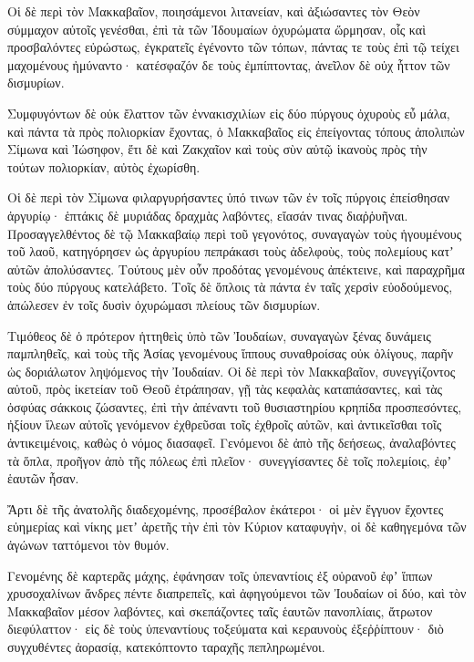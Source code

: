 {\par }{\PP {}Οἱ δὲ περὶ τὸν Μακκαβαῖον, ποιησάμενοι λιτανείαν, καὶ ἀξιώσαντες τὸν Θεὸν σύμμαχον αὐτοῖς γενέσθαι, ἐπὶ τὰ τῶν Ἰδουμαίων ὀχυρώματα ὥρμησαν,
οἷς καὶ προσβαλόντες εὐρώστως, ἐγκρατεῖς ἐγένοντο τῶν τόπων, πάντας τε τοὺς ἐπὶ τῷ τείχει μαχομένους ἠμύναντο· κατέσφαζόν δε τοὺς ἐμπίπτοντας, ἀνεῖλον δὲ οὐχ ἧττον τῶν δισμυρίων.
\par }{\PP {}Συμφυγόντων δὲ οὐκ ἔλαττον τῶν ἐννακισχιλίων εἰς δύο πύργους ὀχυροὺς εὖ μάλα, καὶ πάντα τὰ πρὸς πολιορκίαν ἔχοντας,
ὁ Μακκαβαῖος εἰς ἐπείγοντας τόπους ἀπολιπὼν Σίμωνα καὶ Ἰώσηφον, ἔτι δὲ καὶ Ζακχαῖον καὶ τοὺς σὺν αὐτῷ ἱκανοὺς πρὸς τὴν τούτων πολιορκίαν, αὐτὸς ἐχωρίσθη.
\par }{\PP {}Οἱ δὲ περὶ τὸν Σίμωνα φιλαργυρήσαντες ὑπό τινων τῶν ἐν τοῖς πύργοις ἐπείσθησαν ἀργυρίῳ· ἑπτάκις δὲ μυριάδας δραχμὰς λαβόντες, εἴασάν τινας διαῤῥυῆναι.
Προσαγγελθέντος δὲ τῷ Μακκαβαίῳ περὶ τοῦ γεγονότος, συναγαγὼν τοὺς ἡγουμένους τοῦ λαοῦ, κατηγόρησεν ὡς ἀργυρίου πεπράκασι τοὺς ἀδελφοὺς, τοὺς πολεμίους κατʼ αὐτῶν ἀπολύσαντες.
Τούτους μὲν οὖν προδότας γενομένους ἀπέκτεινε, καὶ παραχρῆμα τοὺς δύο πύργους κατελάβετο.
Τοῖς δὲ ὅπλοις τὰ πάντα ἐν ταῖς χερσὶν εὐοδούμενος, ἀπώλεσεν ἐν τοῖς δυσὶν ὀχυρώμασι πλείους τῶν δισμυρίων.
\par }{\PP {}Τιμόθεος δὲ ὁ πρότερον ἡττηθεὶς ὑπὸ τῶν Ἰουδαίων, συναγαγὼν ξένας δυνάμεις παμπληθεῖς, καὶ τοὺς τῆς Ἀσίας γενομένους ἵππους συναθροίσας οὐκ ὀλίγους, παρῆν ὡς δοριάλωτον ληψόμενος τὴν Ἰουδαίαν.
Οἱ δὲ περὶ τὸν Μακκαβαῖον, συνεγγίζοντος αὐτοῦ, πρὸς ἱκετείαν τοῦ Θεοῦ ἐτράπησαν, γῇ τὰς κεφαλὰς καταπάσαντες, καὶ τὰς ὀσφύας σάκκοις ζώσαντες,
ἐπὶ τὴν ἀπέναντι τοῦ θυσιαστηρίου κρηπίδα προσπεσόντες, ἠξίουν ἵλεων αὐτοῖς γενόμενον ἐχθρεῦσαι τοῖς ἐχθροῖς αὐτῶν, καὶ ἀντικεῖσθαι τοῖς ἀντικειμένοις, καθὼς ὁ νόμος διασαφεῖ.
Γενόμενοι δὲ ἀπὸ τῆς δεήσεως, ἀναλαβόντες τὰ ὅπλα, προῆγον ἀπὸ τῆς πόλεως ἐπὶ πλεῖον· συνεγγίσαντες δὲ τοῖς πολεμίοις, ἐφʼ ἑαυτῶν ἦσαν.
\par }{\PP {}Ἄρτι δὲ τῆς ἀνατολῆς διαδεχομένης, προσέβαλον ἑκάτεροι· οἱ μὲν ἔγγυον ἔχοντες εὐημερίας καὶ νίκης μετʼ ἀρετῆς τὴν ἐπὶ τὸν Κύριον καταφυγὴν, οἱ δὲ καθηγεμόνα τῶν ἀγώνων ταττόμενοι τὸν θυμόν.
\par }{\PP {}Γενομένης δὲ καρτερᾶς μάχης, ἐφάνησαν τοῖς ὑπεναντίοις ἐξ οὐρανοῦ ἐφʼ ἵππων χρυσοχαλίνων ἄνδρες πέντε διαπρεπεῖς, καὶ ἀφηγούμενοι τῶν Ἰουδαίων οἱ δύο,
καὶ τὸν Μακκαβαῖον μέσον λαβόντες, καὶ σκεπάζοντες ταῖς ἑαυτῶν πανοπλίαις, ἄτρωτον διεφύλαττον· εἰς δὲ τοὺς ὑπεναντίους τοξεύματα καὶ κεραυνοὺς ἐξεῤῥίπτουν· διὸ συγχυθέντες ἀορασίᾳ, κατεκόπτοντο ταραχῆς πεπληρωμένοι.
}
